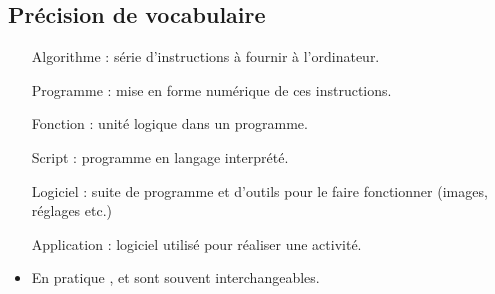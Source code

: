 \subsection{Précision de vocabulaire}
\begin{frame}
	\begin{itemize}
		\item[Algorithme] : série d'instructions à fournir à l'ordinateur.
		\item[Programme] : mise en forme numérique de ces instructions. 
		\item[Fonction] : unité logique dans un programme.
		\item[Script] : programme en langage interprété.
		\item[Logiciel] : suite de programme et d'outils pour le faire fonctionner (images, réglages etc.)
		\item[Application] : logiciel utilisé pour réaliser une activité.
		\item En pratique , et  sont souvent interchangeables.
	\end{itemize}
\end{frame}